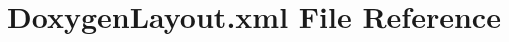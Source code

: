 \hypertarget{_doxygen_layout_8xml}{}\section{Doxygen\+Layout.\+xml File Reference}
\label{_doxygen_layout_8xml}

